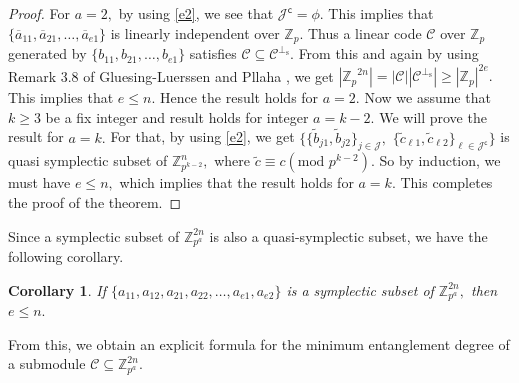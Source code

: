 \documentclass{article}
\newtheorem{cor}{Corollary}[section]
\theoremstyle{remark}
\theoremstyle{definition}
\numberwithin{equation}{section}
\begin{document}
\begin{proof}
  
  
For $a=2,$ by using  \eqref{e2}, we see that $\mathcal{J}^\mathsf{c}=\phi.$ This implies that $\{\overline{a}_{11},\overline{a}_{21},\ldots,\overline{a}_{e1}\}$ is linearly independent over $\mathbb{Z}_{p}.$  Thus  a linear code $\mathcal{C}$ over  $\mathbb{Z}_p$ generated by  $\{b_{11},b_{21},\ldots,b_{e1}\}$ satisfies $\mathcal{C} \subseteq \mathcal{C}^{\perp_{\mathrm{s}}}.$ From this and again by using Remark 3.8 of  Gluesing-Luerssen and Pllaha  \cite{luerssen}, we get $|{\mathbb{Z}_p}^{2n}|=|\mathcal{C}||\mathcal{C}^{\perp_{\mathrm{s}}}|\geq |{\mathbb{Z}_p}|^{2e}.$ This implies that $e \leq n.$  Hence the result holds for $a=2.$   Now we assume that $k\geq 3$  be a fix integer and result holds for integer $a=k-2.$
  We will prove the result for $a=k.$ For that, by using \eqref{e2}, we get $\{ \{\tilde{b}_{j1},\tilde{b}_{j2}\}_{j \in \mathcal{J}},$   $ \{\tilde{c}_{\ell1},\tilde{c}_{\ell2}\}_{\ell \in \mathcal{J}^\mathsf{c}}\}$ is quasi symplectic subset of $\mathbb{Z}_{p^{k-2}}^n,$ where $\tilde{c}\equiv c  (\text{mod~}p^{k-2}).$ So by induction, we must have $e \leq n,$ which implies that the result holds for $a=k.$ This completes the proof of the theorem. 
\end{proof}

Since a symplectic subset of $\mathbb{Z}_{p^a}^{2n}$ is also a quasi-symplectic subset, we have the following corollary.

\begin{cor}\label{cor2} If $\{a_{11},a_{12},a_{21},a_{22},\ldots,a_{e1},a_{e2}\}$ is  a symplectic subset of ${\mathbb{Z}^{2n}_{p^a}},$ then $e \leq n.$ \end{cor}

From this, we obtain an explicit formula for the minimum entanglement degree of a submodule $\mathcal{C} \subseteq \mathbb{Z}_{p^a}^{2n}.$
\end{document}
